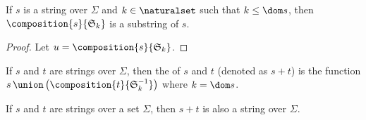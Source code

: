 \begin{thm}
     \label{thm:metatheory-the-composition-of-a-string-with-the-k-shift-of-N-is-also-a-substring}
    If \( s \) is a string over \( \Sigma \) and \( k \in \naturalset \) such that \( k \leq \dom s \),
    then \( \composition{s}{ \mathfrak{S}_{k} } \) is a substring of \( s \).
\end{thm}

\begin{proof}
    Let \( u = \composition{s}{\mathfrak{S}_{k}} \).
\end{proof}

\begin{dfn}[Concatenation]
     \label{dfn:metatheory-concantenation-of-strings}
    If \( s \) and \( t \) are strings over \( \Sigma \), then the  of \( s \) and \( t \) (denoted as \( s + t \))
    is the function \( s \,{\union}\, \mleft( \composition{t}{ \mathfrak{S}^{-1}_{k} } \mright) \) where \( k = \dom s \).
\end{dfn}

\begin{thm}
     \label{thm:metatheory-the-concantenation-of-two-strings-over-an-alphabet-is-also-a-string-over-the-same-alphabet}
    If \( s \) and \( t \) are strings over a set \( \Sigma \), then \( s + t \) is also a string over \( \Sigma \).
\end{thm}

